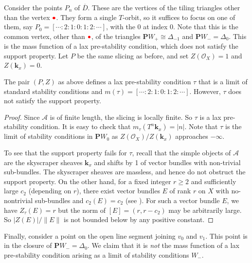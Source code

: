 \documentclass{amsart}
\begin{document}
Consider the points \(P_n\) of \(\overline D\).
These are the vertices of the tiling triangles other than the vertex \(\textcolor{red}{\bullet}\).
They form a single \(T\)-orbit, so it suffices to focus on one of them, say \(P_0 = [\cdots : 2:1:0:1:2: \cdots]\), with the \(0\) at index \(0\).
Note that this is the common vertex, other than \(\textcolor{red}{\bullet}\), of the triangles \(\mathbf{P}W_{+} \cong \Delta_{-1}\) and \(\mathbf{P}W_- = \Delta_0\).
This is the mass function of a lax pre-stability condition, which does not satisfy the support property.
Let \(P\) be the same slicing as before, and set \(Z(\mathcal{O}_X) = 1\) and \(Z(\mathbf{k}_x) = 0\).
\begin{proposition}\label{prop:v0}
  The pair \((P,Z)\) as above defines a lax pre-stability condition \(\tau\) that is a limit of standard stability conditions and \(m(\tau) = [\cdots : 2: 1 : 0: 1 : 2: \cdots]\).
  However, \(\tau\) does not satisfy the support property.
\end{proposition}
\begin{proof}
  Since \(\mathcal{A}\) is of finite length, the slicing is locally finite.
  So \(\tau\) is a lax pre-stability condition.
  It is easy to check that \(m_{\tau}(T^{n} \mathbf{k}_x) = |n|\).
  Note that \(\tau\) is the limit of stability conditions in \(\mathbf{P}W_0\) as \(Z(\mathcal{O}_X)/Z(\mathbf{k}_x)\) approaches \(-\infty\).

  To see that the support property fails for \(\tau\), recall that the simple objects of \(\mathcal{A}\) are the skyscraper sheaves \(\mathbf{k}_x\) and shifts by 1 of vector bundles with non-trivial sub-bundles.
  The skyscraper sheaves are massless, and hence do not obstruct the support property.
  On the other hand, for a fixed integer \(r \geq 2\) and sufficiently large \(c_2\) (depending on \(r\)), there exist vector bundles \(E\) of rank \(r\) on \(X\) with no-nontrivial sub-bundles and \(c_2(E) = c_2\) (see \cite[Th\'eo\`eme~5.3]{ban.le-pot:87}).
  For such a vector bundle \(E\), we have \(Z_{\tau}(E) = r\) but the norm of \([E] = (r, r-c_2)\) may be arbitrarily large.
  So \(|Z(E)|/\|E\|\) is not bounded below by any positive constant.
\end{proof}


Finally, consider a point on the open line segment joining \(v_{0}\) and \(v_{1}\).
This point is in the closure of \(\mathbf{P}W_- = \Delta_0\).
We claim that it is \emph{not} the mass function of a lax pre-stability condition arising as a limit of stability conditions \(W_-\).
\end{document}
